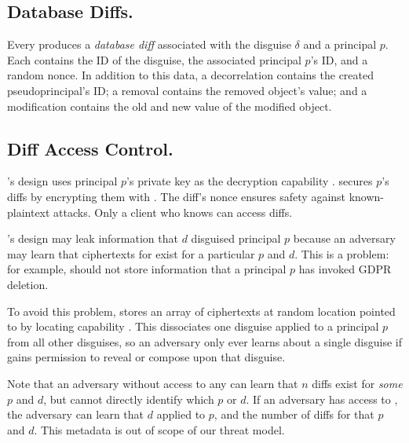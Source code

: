 \subsection{Database Diffs.}
Every  produces a \emph{database diff}  associated with the disguise $\delta$ and a principal $p$. 
%
Each  contains the ID of the disguise, the associated principal $p$'s ID,
and a random nonce.
%
In addition to this data, a decorrelation  contains the created pseudoprincipal's
ID; a removal  contains the removed object's value; and a modification
 contains the old and new value of the modified object.

\subsection{Diff Access Control.} 

\sys's design uses principal $p$'s private key  as the decryption capability . \sys
secures $p$'s diffs  by encrypting them with . The diff's nonce ensures safety
against known-plaintext attacks. 
Only a client who knows  can access diffs.

%

\sys's design may leak information that $d$ disguised principal $p$ because an adversary may learn
that ciphertexts for  exist for a particular $p$ and $d$.  This is a problem: for example,
\sys should not store information that a principal $p$ has invoked GDPR deletion.

To avoid this problem, \sys stores an array of  ciphertexts at random location pointed to
by locating capability .  This dissociates one disguise applied to a principal $p$ from
all other disguises, so an adversary only ever learns about a single disguise if \sys gains
permission to reveal or compose upon that disguise.

Note that an adversary without access to any  can learn that $n$ diffs exist for
\emph{some} $p$ and $d$, but cannot directly identify which $p$ or $d$.  If an adversary has access
to , the adversary can learn that $d$ applied to $p$, and the number of  diffs
for that $p$ and $d$. This metadata is out of scope of our threat model.

